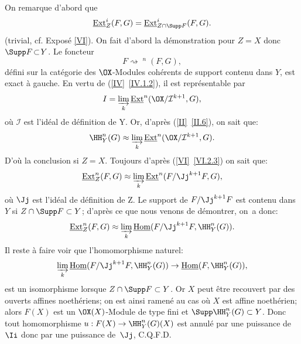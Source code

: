 On remarque d'abord que
\[
\mathop{\underline{\mathrm{Ext}}}\nolimits^i_Z(F, G) = \mathop{\underline{\mathrm{Ext}}}\nolimits^i_{Z \cap \Supp F}(F, G).
\]
(trivial, cf. Expos\'e \ref{VI}). On fait d'abord la d\'emonstration pour $Z \!=\! X$ donc \hbox{$\Supp F \!\subset\! Y$}. Le foncteur
\[F \rightsquigarrow \mathop{\underline{\mathrm{Ext}}}\nolimits^n(F, G),
\]
d\'efini sur la cat\'egorie des $\OX$-Modules coh\'erents de support contenu dans $Y$, est exact \`a gauche. En vertu de (\ref{IV}~\ref{IV.1.2}), il est repr\'esentable par
\[I = \varinjlim_{k} \mathop{\underline{\mathrm{Ext}}}\nolimits^n (\OX/\mathcal{I}^{k+1}, G),
\]
o\`u $\mathcal{I}$ est l'id\'eal de d\'efinition de Y. Or, d'apr\`es (\ref{II}~\ref{II.6}), on sait que:
\[
\HH^n_Y(G) \approx \varinjlim_{k} \mathop{\underline{\mathrm{Ext}}}\nolimits^n (\OX/\mathcal{I}^{k+1}, G).
\]
D'o\`u la conclusion si $ Z= X$. Toujours d'apr\`es (\ref{VI}~\ref{VI.2.3}) on sait que:
\[
\mathop{\underline{\mathrm{Ext}}}\nolimits^n_Z (F, G) \approx \varinjlim_{k} \mathop{\underline{\mathrm{Ext}}}\nolimits^n (F/\Jj^{k + 1}F, G),
\]
o\`u $\Jj$ est l'id\'eal de d\'efinition de Z. Le support de $F/\Jj^{k+1}F$ est contenu dans $Y$ si $Z \cap \Supp F \subset Y$; d'apr\`es ce que nous venons de d\'emontrer, on~a donc:
\[
\mathop{\underline{\mathrm{Ext}}}\nolimits^n_Z (F, G) \approx \varinjlim_{k} \mathop{\underline{\mathrm{Hom}}}\nolimits (F/\Jj^{k + 1}F, \HH^n_Y(G)).
\]
Il reste \`a faire voir que l'homomorphisme naturel:
\[
\varinjlim_{k} \mathop{\underline{\mathrm{Hom}}}\nolimits (F/\Jj^{k + 1}F, \HH^n_Y(G)) \to \mathop{\underline{\mathrm{Hom}}}\nolimits (F, \HH^n_Y (G)),
\]
est un isomorphisme lorsque $Z \cap \Supp F \subset Y$. Or $X$ peut \^etre recouvert par des ouverts affines noeth\'eriens; on est ainsi ramen\'e au cas o\`u $X$ est affine noeth\'erien; alors $F(X)$ est un $\OX(X)$-Module de type fini et $\Supp \HH^n_Y(G) \subset Y$. Donc tout homomorphisme \hbox{$u: F(X) \to \HH^n_Y (G) (X)$} est annul\'e par une puissance de $\Ii$ donc par une puissance de~$\Jj$, C.Q.F.D.

